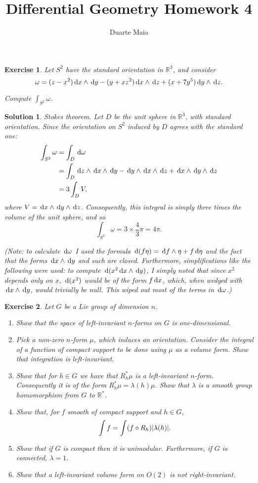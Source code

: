 \documentclass{article}
\title{Differential Geometry Homework 4}
\author{Duarte Maia}
\date{}
\newtheorem{ex}{Exercise}
\theoremstyle{nonumberplain}
\newtheorem{sol}{Solution}
\newcommand{\R}{\mathbb{R}}
\DeclarePairedDelimiter{\abs}{\lvert}{\rvert}
\begin{document}
\maketitle

\begin{ex}
Let $S^2$ have the standard orientation in $\R^3$, and consider
\[\omega = (z-x^2) \dl x \wedge \dl y - (y + xz^2) \dl x \wedge \dl z + (x + 7y^5) \dl y \wedge \dl z.\]

Compute $\int_{S^2} \omega$.
\end{ex}

\begin{sol}
Stokes theorem. Let $D$ be the unit sphere in $\R^3$, with standard orientation. Since the orientation on $S^2$ induced by $D$ agrees with the standard one:
\begin{align*}
\int_{S^2} \omega &= \int_D \dl \omega\\
&= \int_D \dl z \wedge \dl x \wedge \dl y - \dl y \wedge \dl x \wedge \dl z + \dl x \wedge \dl y \wedge \dl z\\
&= 3 \int_D V,
\end{align*}
where $V = \dl x \wedge \dl y \wedge \dl z$. Consequently, this integral is simply three times the volume of the unit sphere, and so
\[\int_{S^2} \omega = 3 \times \frac43 \pi = 4\pi.\]

(Note: to calculate $\dl \omega$ I used the formula $\dl(f \eta) = \dl f \wedge \eta + f \dl \eta$ and the fact that the forms $\dl x \wedge \dl y$ and such are closed. Furthermore, simplifications like the following were used: to compute $\dl(x^2 \dl x \wedge \dl y)$, I simply noted that since $x^2$ depends only on $x$, $\dl(x^2)$ would be of the form $f \dl x$, which, when wedged with $\dl x \wedge \dl y$, would trivially be null. This wiped out most of the terms in $\dl \omega$.)
\end{sol}

\begin{ex}
Let $G$ be a Lie group of dimension $n$.
\begin{enumerate}
\item Show that the space of left-invariant $n$-forms on $G$ is one-dimensional.
\item Pick a non-zero $n$-form $\mu$, which induces an orientation. Consider the integral of a function of compact support to be done using $\mu$ as a volume form. Show that integration is left-invariant.
\item Show that for $h \in G$ we have that $R_h^* \mu$ is a left-invariant $n$-form. Consequently it is of the form $R_h^* \mu = \lambda(h) \mu$. Show that $\lambda$ is a smooth group homomorphism from $G$ to $\R^*$.
\item Show that, for $f$ smooth of compact support and $h \in G$,
\[\int f = \int (f \circ R_h) \abs{\lambda(h)}.\]
\item Show that if $G$ is compact then it is unimodular. Furthermore, if $G$ is connected, $\lambda = 1$.
\item Show that a left-invariant volume form on $O(2)$ is not right-invariant. 
\end{enumerate}
\end{ex}
\end{document}
